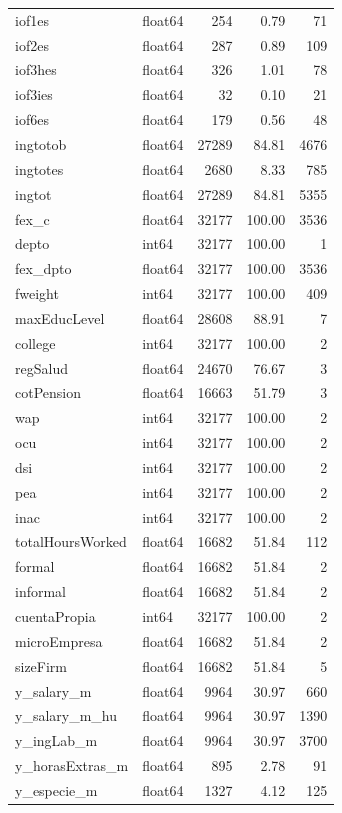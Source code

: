 \begin{longtable}{llrrr}
iof1es & float64 & 254 & 0.79 & 71 \\
iof2es & float64 & 287 & 0.89 & 109 \\
iof3hes & float64 & 326 & 1.01 & 78 \\
iof3ies & float64 & 32 & 0.10 & 21 \\
iof6es & float64 & 179 & 0.56 & 48 \\
ingtotob & float64 & 27289 & 84.81 & 4676 \\
ingtotes & float64 & 2680 & 8.33 & 785 \\
ingtot & float64 & 27289 & 84.81 & 5355 \\
fex\_c & float64 & 32177 & 100.00 & 3536 \\
depto & int64 & 32177 & 100.00 & 1 \\
fex\_dpto & float64 & 32177 & 100.00 & 3536 \\
fweight & int64 & 32177 & 100.00 & 409 \\
maxEducLevel & float64 & 28608 & 88.91 & 7 \\
college & int64 & 32177 & 100.00 & 2 \\
regSalud & float64 & 24670 & 76.67 & 3 \\
cotPension & float64 & 16663 & 51.79 & 3 \\
wap & int64 & 32177 & 100.00 & 2 \\
ocu & int64 & 32177 & 100.00 & 2 \\
dsi & int64 & 32177 & 100.00 & 2 \\
pea & int64 & 32177 & 100.00 & 2 \\
inac & int64 & 32177 & 100.00 & 2 \\
totalHoursWorked & float64 & 16682 & 51.84 & 112 \\
formal & float64 & 16682 & 51.84 & 2 \\
informal & float64 & 16682 & 51.84 & 2 \\
cuentaPropia & int64 & 32177 & 100.00 & 2 \\
microEmpresa & float64 & 16682 & 51.84 & 2 \\
sizeFirm & float64 & 16682 & 51.84 & 5 \\
y\_salary\_m & float64 & 9964 & 30.97 & 660 \\
y\_salary\_m\_hu & float64 & 9964 & 30.97 & 1390 \\
y\_ingLab\_m & float64 & 9964 & 30.97 & 3700 \\
y\_horasExtras\_m & float64 & 895 & 2.78 & 91 \\
y\_especie\_m & float64 & 1327 & 4.12 & 125 \\

\end{longtable}

